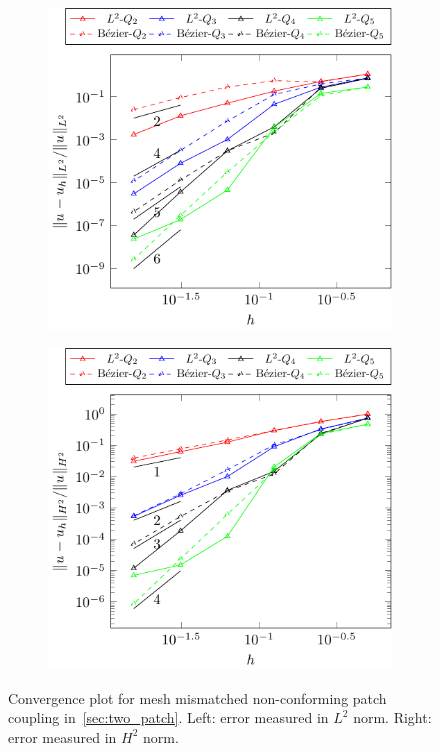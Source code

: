 \documentclass[preprint,12pt]{elsarticle}
\theoremstyle{remark}
\begin{document}
\begin{figure}[hbt]
    \centering
    \begin{subfigure}[b]{0.48\textwidth}
        \includegraphics[width=\textwidth]{two_patch_biharmonic_nonmatch}
    \end{subfigure}
    \begin{subfigure}[b]{0.48\textwidth}
        \includegraphics[width=\textwidth]{two_patch_biharmonic_nonmatch_H2}
    \end{subfigure}
	\caption{Convergence plot for mesh mismatched non-conforming patch coupling in~\ref{sec:two_patch}. Left: error measured in $L^2$ norm. Right: error measured in $H^2$ norm.}\label{fig:two_patc_biharmonic_convergence_nonmatch}
\end{figure}
\end{document}
